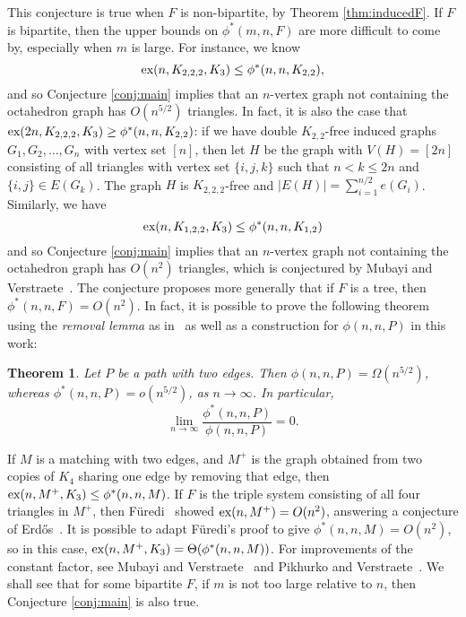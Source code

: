 \documentclass[12pt]{article}
\newtheorem{theorem}{Theorem}
\newcommand*{\ex}{\textnormal{ex}}
\begin{document}
This conjecture is true when $F$ is non-bipartite, by Theorem \ref{thm:inducedF}. If $F$ is bipartite, then the upper bounds on $\phi^*(m, n, F)$ are more difficult to come by, especially when $m$ is large. For instance, we know 
\[ 
  \ex(n, K_{2,2,2}, K_3) \leq \phi^*(n, n, K_{2,2}),
\]
and so Conjecture \ref{conj:main} implies that an $n$-vertex graph not containing the octahedron graph has $O(n^{5/2})$ triangles. In fact, it is also the case that $\ex(2n, K_{2,2,2}, K_3) \geq \phi^*(n, n, K_{2,2})$: if we have double $K_{2,2}$-free induced graphs $G_1, G_2, \dots, G_{n}$ with vertex set $[n]$, then let $H$ be the graph with $V(H) = [2n]$ consisting of all triangles with vertex set $\{i, j, k\}$ such that $n < k \leq 2n$ and $\{i, j\} \in E(G_k)$. The graph $H$ is $K_{2, 2, 2}$-free and $|E(H)| = \sum_{i = 1}^{n/2} e(G_i)$. Similarly, we have
\[ 
  \ex(n, K_{1, 2, 2}, K_3) \leq \phi^*(n, n, K_{1,2})
\]
and so Conjecture \ref{conj:main} implies that an $n$-vertex graph not containing the octahedron graph has $O(n^{2})$ triangles, which is conjectured by Mubayi and Verstraete~\cite{MubayiV2016}. The conjecture proposes more generally that if $F$ is a tree, then $\phi^*(n, n, F) = O(n^2)$. In fact, it is possible to prove the following theorem using the \textit{removal lemma} as in~\cite{MubayiMukherjee2023} as well as a construction for $\phi(n, n, P)$ in this work:

\begin{theorem}\label{thm:inducedP}
Let $P$ be a path with two edges. Then $\phi(n, n, P) = \Omega(n^{5/2})$, whereas $\phi^*(n, n, P) = o(n^{5/2})$, as $n \rightarrow \infty$. In particular, 
\[ 
  \lim_{n \rightarrow \infty} \frac{\phi^*(n, n, P)}{\phi(n, n, P)} = 0.
\]
\end{theorem}

If $M$ is a matching with two edges, and $M^+$ is the graph obtained from two copies of $K_4$ sharing one edge by removing that edge, then $\ex(n, M^+, K_3) \leq \phi^*(n, n, M)$. If $F$ is the triple system consisting of all four triangles in $M^+$, then F\"{u}redi~\cite{Furedi1984} showed $\ex(n, M^+) = O(n^2)$, answering a conjecture of Erd\H{o}s~\cite{Erdos1977}. It is possible to adapt F\"{u}redi's proof to give $\phi^*(n, n, M) = O(n^2)$, so in this case, $\ex(n, M^+, K_3) = \Theta(\phi^*(n, n, M))$. For improvements of the constant factor, see Mubayi and Verstraete~\cite{MubayiV2004} and Pikhurko and Verstraete~\cite{PikhurkoV2009}. We shall see that for some bipartite $F$, if $m$ is not too large relative to $n$, then Conjecture \ref{conj:main} is also true. 
\end{document}
